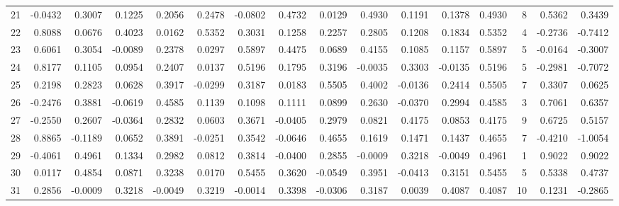 \begin{tabular}{lrrrrrrrrrrrrrrr}
21  &     -0.0432 &  0.3007 &  0.1225 &  0.2056 &  0.2478 & -0.0802 &  0.4732 &  0.0129 &  0.4930 &  0.1191 &   0.1378 &     0.4930 &      8 &                    0.5362 &                     0.3439 \\
22  &      0.8088 &  0.0676 &  0.4023 &  0.0162 &  0.5352 &  0.3031 &  0.1258 &  0.2257 &  0.2805 &  0.1208 &   0.1834 &     0.5352 &      4 &                   -0.2736 &                    -0.7412 \\
23  &      0.6061 &  0.3054 & -0.0089 &  0.2378 &  0.0297 &  0.5897 &  0.4475 &  0.0689 &  0.4155 &  0.1085 &   0.1157 &     0.5897 &      5 &                   -0.0164 &                    -0.3007 \\
24  &      0.8177 &  0.1105 &  0.0954 &  0.2407 &  0.0137 &  0.5196 &  0.1795 &  0.3196 & -0.0035 &  0.3303 &  -0.0135 &     0.5196 &      5 &                   -0.2981 &                    -0.7072 \\
25  &      0.2198 &  0.2823 &  0.0628 &  0.3917 & -0.0299 &  0.3187 &  0.0183 &  0.5505 &  0.4002 & -0.0136 &   0.2414 &     0.5505 &      7 &                    0.3307 &                     0.0625 \\
26  &     -0.2476 &  0.3881 & -0.0619 &  0.4585 &  0.1139 &  0.1098 &  0.1111 &  0.0899 &  0.2630 & -0.0370 &   0.2994 &     0.4585 &      3 &                    0.7061 &                     0.6357 \\
27  &     -0.2550 &  0.2607 & -0.0364 &  0.2832 &  0.0603 &  0.3671 & -0.0405 &  0.2979 &  0.0821 &  0.4175 &   0.0853 &     0.4175 &      9 &                    0.6725 &                     0.5157 \\
28  &      0.8865 & -0.1189 &  0.0652 &  0.3891 & -0.0251 &  0.3542 & -0.0646 &  0.4655 &  0.1619 &  0.1471 &   0.1437 &     0.4655 &      7 &                   -0.4210 &                    -1.0054 \\
29  &     -0.4061 &  0.4961 &  0.1334 &  0.2982 &  0.0812 &  0.3814 & -0.0400 &  0.2855 & -0.0009 &  0.3218 &  -0.0049 &     0.4961 &      1 &                    0.9022 &                     0.9022 \\
30  &      0.0117 &  0.4854 &  0.0871 &  0.3238 &  0.0170 &  0.5455 &  0.3620 & -0.0549 &  0.3951 & -0.0413 &   0.3151 &     0.5455 &      5 &                    0.5338 &                     0.4737 \\
31  &      0.2856 & -0.0009 &  0.3218 & -0.0049 &  0.3219 & -0.0014 &  0.3398 & -0.0306 &  0.3187 &  0.0039 &   0.4087 &     0.4087 &     10 &                    0.1231 &                    -0.2865 \\

\end{tabular}
